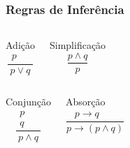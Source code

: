\documentclass{beamer}
\begin{document}
\begin{frame}
\frametitle{Regras de Inferência}

\begin{columns}[c]
	\large
	\begin{block}{Adição}
	   \begin{equation*}
	   	\frac{\begin{array}{ll}p  & ~~ \end{array}}{p \vee q}
	   \end{equation*}
 	\end{block}
	
\begin{block}{Simplificação}
	\large
	\begin{equation*}
	\frac{p \wedge q}{p}
	\end{equation*}	
\end{block}

\end{columns}\vfill

\begin{columns}[c]
	\large
	\begin{block}{Conjunção}
		\begin{equation*}
	\frac{\begin{array}{ll} p & ~~ \\ q & ~~\end{array}}{p \wedge q}
		\end{equation*}
	\end{block}
	
\begin{block}{Absorção}
	\large
	\begin{equation*}
	\frac{\begin{array}{ll}p \rightarrow q & ~~~~\end{array}}{p \rightarrow (p \wedge q)}
	\end{equation*}
\end{block}	
	
\end{columns}

\end{frame}
\end{document}
